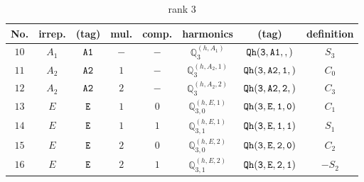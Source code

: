 \documentclass[fleqn,8pt]{jsarticle}
\begin{document}
\begin{table}[ht!]
\begin{center}
\caption{rank 3}
\renewcommand{\arraystretch}{1.3}
\begin{tabular}{cccccccc} \hline \hline
No. & irrep. & (tag) & mul. & comp. & harmonics & (tag) & definition \\ \hline
$ 10 $ & $ A_{1} $ & $ {\tt A1} $ & $ - $ & $ - $ & $ \mathbb{Q}_{3}^{(h,A_{1})} $ & $ {\tt Qh(3,A1,,)} $ & $ S_{3} $ \\
$ 11 $ & $ A_{2} $ & $ {\tt A2} $ & $ 1 $ & $ - $ & $ \mathbb{Q}_{3}^{(h,A_{2},1)} $ & $ {\tt Qh(3,A2,1,)} $ & $ C_{0} $ \\
$ 12 $ & $ A_{2} $ & $ {\tt A2} $ & $ 2 $ & $ - $ & $ \mathbb{Q}_{3}^{(h,A_{2},2)} $ & $ {\tt Qh(3,A2,2,)} $ & $ C_{3} $ \\
$ 13 $ & $ E $ & $ {\tt E} $ & $ 1 $ & $ 0 $ & $ \mathbb{Q}_{3,0}^{(h,E,1)} $ & $ {\tt Qh(3,E,1,0)} $ & $ C_{1} $ \\
$ 14 $ & $ E $ & $ {\tt E} $ & $ 1 $ & $ 1 $ & $ \mathbb{Q}_{3,1}^{(h,E,1)} $ & $ {\tt Qh(3,E,1,1)} $ & $ S_{1} $ \\
$ 15 $ & $ E $ & $ {\tt E} $ & $ 2 $ & $ 0 $ & $ \mathbb{Q}_{3,0}^{(h,E,2)} $ & $ {\tt Qh(3,E,2,0)} $ & $ C_{2} $ \\
$ 16 $ & $ E $ & $ {\tt E} $ & $ 2 $ & $ 1 $ & $ \mathbb{Q}_{3,1}^{(h,E,2)} $ & $ {\tt Qh(3,E,2,1)} $ & $ - S_{2} $ \\
 \hline \hline
\end{tabular}
\end{center}
\end{table}
\end{document}
